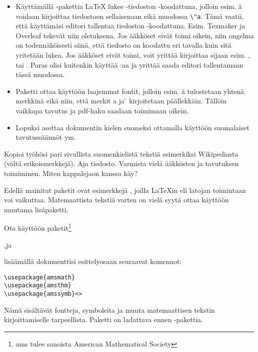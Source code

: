 \begin{fframe}
    \begin{extra}
        \begin{itemize}
            \item Käyttämällä -pakettia \LaTeX{} lukee -tiedoston -koodattuna, jolloin esim. ä voidaan kirjoittaa tiedostoon sellaisenaan eikä muodossa \lstinline-\"a-. Tämä vaatii, että käyttämäsi editori tallentaa tiedoston -koodattuna. Esim. Texmaker ja Overleaf tekevät niin oletuksena. Jos ääkköset eivät toimi oikein, niin ongelma on todennäköisesti siinä, että tiedosto on koodattu eri tavalla kuin sitä yritetään lukea. Jos ääkköset eivät toimi, voit yrittää kirjoittaa \cns{[utf8]} sijaan esim. \cns{[latin1]}, \cns{[ansinew]} tai \cns{[applemac]}. Paras olisi kuitenkin käyttää \cns{[utf8]}:aa ja yrittää saada editori tallentamaan tässä muodossa.
            \item Paketti  ottaa käyttöön laajemmat fontit, jolloin esim. ä tulostetaan yhtenä merkkinä eikä niin, että merkit a ja \"{} kirjoitetaan päällekkäin. Tällöin vaikkapa tavutus ja pdf-haku saadaan toimimaan oikein.
            \item Lopuksi  asettaa dokumentin kielen suomeksi ottamalla käyttöön suomalaiset tavutussäännöt ym.
        \end{itemize}
    \end{extra}
\end{fframe}

\begin{fframe}
    \begin{harj}
        Kopioi työhösi pari sivullista suomenkielistä tekstiä esimerkiksi Wikipediasta (vältä erikoismerkkejä). Aja tiedosto. Varmista vielä ääkkösten ja tavutuksen toimiminen. Miten kappalejaon kanssa käy?
    \end{harj}
\end{fframe}

\begin{fframe}
    Edellä mainitut paketit ovat esimerkkejä , joilla \LaTeX in eli latojan toimintaan voi vaikuttaa. 
    \pause
    Matemaattista tekstiä varten on vielä syytä ottaa käyttöön muutama lisäpaketti. 
    \begin{harj}
        Ota käyttöön paketit\footnote{ams tulee sanoista American Mathematical Society}
        \begin{center}
            ,\quad {}\quad ja\quad {}
        \end{center}
        lisäämällä dokumenttisi esittelyosaan seuraavat komennot:
        \begin{lstlisting}
\usepackage{amsmath}
\usepackage{amsthm}
\usepackage{amssymb}<>
        \end{lstlisting}
        \pause
        Nämä sisältävät fontteja, symboleita ja muuta matemaattisen tekstin kirjoittamiselle tarpeellista. Paketti  on ladattava ennen -pakettia.
    \end{harj}
\end{fframe}

